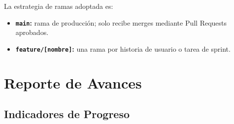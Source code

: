 La estrategia de ramas adoptada es:

\begin{itemize}[leftmargin=1.5em]
  \item \textbf{\texttt{main}:} rama de producción; solo recibe merges mediante Pull Requests aprobados.
  \item \textbf{\texttt{feature/[nombre]}:} una rama por historia de usuario o tarea de sprint.
\end{itemize}


\section{Reporte de Avances}

\subsection{Indicadores de Progreso}

